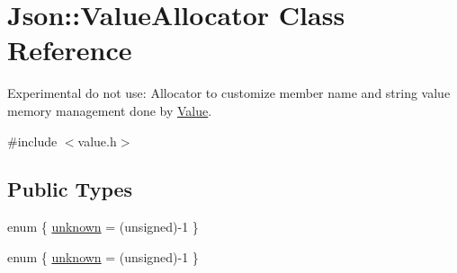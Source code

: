 \hypertarget{classJson_1_1ValueAllocator}{\section{Json\-:\-:Value\-Allocator Class Reference}
\label{de/dd4/classJson_1_1ValueAllocator}
}


Experimental do not use\-: Allocator to customize member name and string value memory management done by \hyperlink{classJson_1_1Value}{Value}.  




{\ttfamily \#include $<$value.\-h$>$}

\subsection*{Public Types}
\begin{DoxyCompactItemize}
\item 
enum \{ \hyperlink{classJson_1_1ValueAllocator_a4ad5932b165e5b11e1a6227f503e38a6a38d36853ecb0922efe7ac03c10d5cf75}{unknown} = (unsigned)-\/1
 \}
\item 
enum \{ \hyperlink{classJson_1_1ValueAllocator_a4ad5932b165e5b11e1a6227f503e38a6a38d36853ecb0922efe7ac03c10d5cf75}{unknown} = (unsigned)-\/1
 \}
\end{DoxyCompactItemize}
